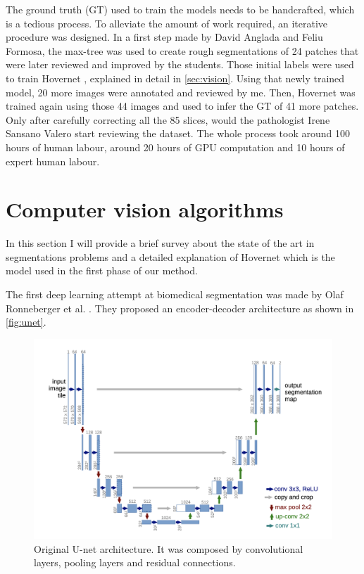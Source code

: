 The ground truth (GT) used to train the models needs to be handcrafted, which is a tedious process. To alleviate the amount of work required, an iterative procedure was designed. In a first step made by David Anglada and Feliu Formosa, the max-tree \cite{maxtree} was used to create rough segmentations of 24 patches that were later reviewed and improved by the students. Those initial labels were used to train Hovernet \cite{hovernet}, explained in detail in \autoref{sec:vision}. Using that newly trained model, 20 more images were annotated and reviewed by me. Then, Hovernet was trained again using those 44 images and used to infer the GT of 41 more patches. Only after carefully correcting all the 85 slices, would the pathologist Irene Sansano Valero start reviewing the dataset. The whole process took around 100 hours of human labour, around 20 hours of GPU computation and 10 hours of expert human labour.

\section{Computer vision algorithms}\label{sec:vision}

In this section I will provide a brief survey about the state of the art in segmentations problems and a detailed explanation of Hovernet \cite{hovernet} which is the model used in the first phase of our method.

The first deep learning attempt at biomedical segmentation was made by Olaf Ronneberger et al. \cite{unet}. They proposed an encoder-decoder architecture as shown in \autoref{fig:unet}.

\begin{figure}[ht]
    \centering
    \includegraphics[width=\textwidth]{imgs/unet.png}
    \caption{Original U-net architecture. It was composed by convolutional layers, pooling layers and residual connections.}
    \label{fig:unet}
\end{figure}

